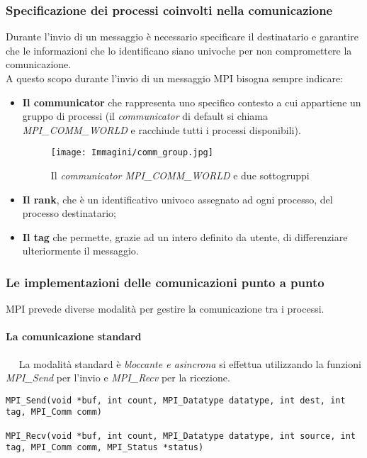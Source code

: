 \subsubsection{Specificazione dei processi coinvolti nella comunicazione}\label{subsec:comm_rank_tag}
Durante l'invio di un messaggio è necessario specificare il destinatario e garantire che le informazioni che lo identificano siano univoche per non compromettere la comunicazione.\\
A questo scopo durante l'invio di un messaggio MPI bisogna sempre indicare:
\begin{itemize}
	\item \textbf{Il communicator} che rappresenta uno specifico contesto a cui appartiene un gruppo di processi (il \textit{communicator} di default si chiama \textit{MPI\_COMM\_WORLD} e racchiude tutti i processi disponibili).
	\begin{figure}[H]
		\centering
		\texttt{[image: Immagini/comm\_group.jpg]}
		\caption{Il \textit{communicator MPI\_COMM\_WORLD} e due sottogruppi}
		\label{fig:mpi_communicator}
	\end{figure}
	\item \textbf{Il rank}, che è un identificativo univoco assegnato ad ogni processo, del processo destinatario;
	\item \textbf{Il tag} che permette, grazie ad un intero definito da utente, di differenziare ulteriormente il messaggio.
\end{itemize}

\subsubsection{Le implementazioni delle comunicazioni punto a punto}
MPI prevede diverse modalità per gestire la comunicazione tra i processi.
\paragraph{La comunicazione standard}~\newline~\newline
La modalità standard è \emph{bloccante e asincrona} si effettua utilizzando la funzioni \textit{MPI\_Send} per l'invio e \textit{MPI\_Recv} per la ricezione.\\
\begin{lstlisting}[label={lst:mpi_send_recv},
caption={Intestazioni delle primitive di comunicazione MPI}]
MPI_Send(void *buf, int count, MPI_Datatype datatype, int dest, int tag, MPI_Comm comm)
         
MPI_Recv(void *buf, int count, MPI_Datatype datatype, int source, int tag, MPI_Comm comm, MPI_Status *status)
\end{lstlisting}


